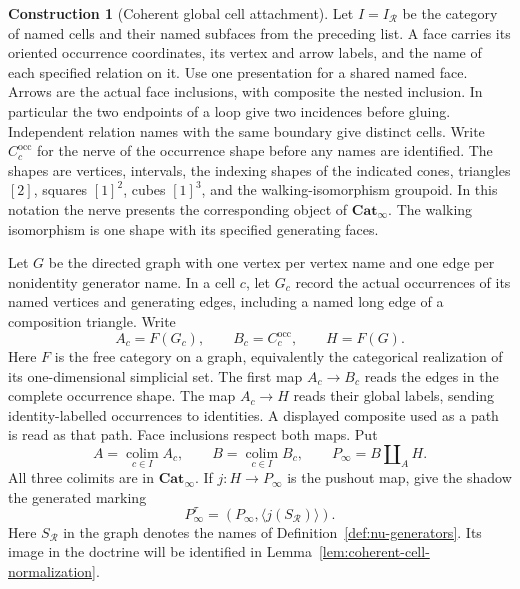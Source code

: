 \documentclass[oneside]{article}
\theoremstyle{plain}
\theoremstyle{definition}
\newtheorem{construction}[theorem]{Construction}
\theoremstyle{remark}
\newcommand{\Cat}{\mathbf{Cat}_{\infty}}
\newcommand{\colim}{\operatorname*{colim}}
\begin{document}
\begin{construction}[Coherent global cell attachment]
\label{con:incidence}
Let $I=I_{\mathcal R}$ be the category of named cells and their named
subfaces from the preceding list. A face carries its oriented occurrence
coordinates, its vertex and arrow labels, and the name of each specified
relation on it. Use one presentation for a shared named face. Arrows are
the actual face inclusions, with composite the nested inclusion. In
particular the two endpoints of a loop give two incidences before gluing.
Independent relation names with the same boundary give distinct cells.
Write $C_c^{\mathrm{occ}}$ for the nerve of the occurrence shape before
any names are identified. The shapes are vertices, intervals, the
indexing shapes of the indicated cones, triangles $[2]$, squares
$[1]^2$, cubes $[1]^3$, and the walking-isomorphism groupoid. In this
notation the nerve presents the corresponding object of $\Cat$.
The walking isomorphism is one shape with its specified generating faces.

Let $G$ be the directed graph with one vertex per vertex name and one edge
per nonidentity generator name. In a cell $c$, let $G_c$ record the
actual occurrences of its named vertices and generating edges, including
a named long edge of a composition triangle. Write
\[
 A_c=F(G_c),\qquad B_c=C_c^{\mathrm{occ}},\qquad H=F(G).
\]
Here $F$ is the free category on a graph, equivalently the categorical
realization of its one-dimensional simplicial set. The first map
$A_c\to B_c$ reads the edges in the complete occurrence shape. The map
$A_c\to H$ reads their global labels, sending identity-labelled occurrences
to identities. A displayed composite used as a path is read as that
path. Face inclusions respect both maps. Put
\begin{equation}\label{eq:coherent-cell-normalization}
 A=\colim_{c\in I} A_c,\qquad B=\colim_{c\in I} B_c,\qquad
 P_\infty=B\amalg_A H .
\end{equation}
All three colimits are in $\Cat$. If $j:H\to P_\infty$ is the pushout
map, give the shadow the generated marking
\begin{equation}\label{eq:finite-shadow}
 P_\infty^\tau=(P_\infty,\langle j(S_{\mathcal R})\rangle).
\end{equation}
Here $S_{\mathcal R}$ in the graph denotes the names of
Definition~\ref{def:nu-generators}. Its image in the doctrine will be
identified in Lemma~\ref{lem:coherent-cell-normalization}.


\end{construction}
\end{document}
